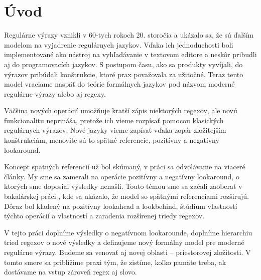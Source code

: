 \chapter*{Úvod}
\label{chap:uvod}
{}

Regulárne výrazy vznikli v 60-tych rokoch 20. storočia a ukázalo sa, že sú ďalším modelom na vyjadrenie regulárnych jazykov. Vďaka ich jednoduchosti boli implementované ako nástroj na vyhľadávanie v textovom editore a neskôr pribudli aj do programovacích jazykov. S postupom času, ako sa produkty vyvíjali, do výrazov pribúdali konštrukcie, ktoré prax považovala za užitočné. Teraz tento model vraciame naspäť do teórie formálnych jazykov pod názvom moderné regulárne výrazy alebo aj regexy.

Väčšina nových operácií umožňuje kratší zápis niektorých regexov, ale novú fun\-kcio\-na\-li\-tu neprináša, pretože ich vieme rozpísať pomocou klasických regulárnych výrazov. Nové jazyky vieme zapísať vďaka zopár zložitejším konštrukciám, menovite sú to spätné referencie, pozitívny a negatívny lookaround.

Koncept spätných referencií už bol skúmaný, v práci sa odvolávame na viaceré články. My sme sa zamerali na operácie pozitívny a negatívny lookaround, o ktorých sme doposiaľ výsledky nenašli. Touto témou sme sa začali zaoberať v bakalárskej práci \cite{mojaBak}, kde sa ukázalo, že model so spätnými referenciami rozširujú. Dôraz bol kladený na pozitívny lookahead a lookbehind, štúdium vlastností týchto operácií a vlastností a zaradenia rozšírenej triedy regexov.

V tejto práci doplníme výsledky o negatívnom lookarounde, doplníme hierarchiu tried regexov o nové výsledky a definujeme nový formálny model pre moderné regulárne výrazy. Budeme sa venovať aj novej oblasti -- priestorovej zložitosti. V tomto smere sa priblížime praxi tým, že zistíme, koľko pamäte treba, ak dostávame na vstup zároveň regex aj slovo.
